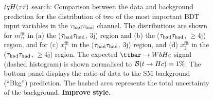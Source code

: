 \begin{figure}[t]
\begin{center}
\caption{$tqH(\tau\bar{\tau})$ search: Comparison between the data and background prediction for the distribution of two of the most 
important BDT input variables in the $\tau_{\mathrm{had}} \tau_{\mathrm{had}}$ channel. The distributions are shown for
$m_{\tau\tau}^{\text{fit}}$ in (a) the ($\tau_{\mathrm{had}} \tau_{\mathrm{had}}$, 3j) region and (b) the ($\tau_{\mathrm{had}} \tau_{\mathrm{had}}$, $\geq$4j) region, and for
(c) $x_{1}^{\text{fit}}$ in the ($\tau_{\mathrm{had}} \tau_{\mathrm{had}}$, 3j)  region, and (d) $x_{2}^{\text{fit}}$ in the ($\tau_{\mathrm{had}} \tau_{\mathrm{had}}$, $\geq$4j) region.
The expected $\Hc$ signal (dashed histogram) is shown normalised to $\mathcal{B}(t\to Hc)=1\%$.
The bottom panel displays the ratio of data to the SM background (``Bkg'') prediction. 
The hashed area represents the total uncertainty of the background. \textbf{Improve style.}} 
\label{fig:BDT_inputs_hadhad}
\end{center}
\end{figure}

